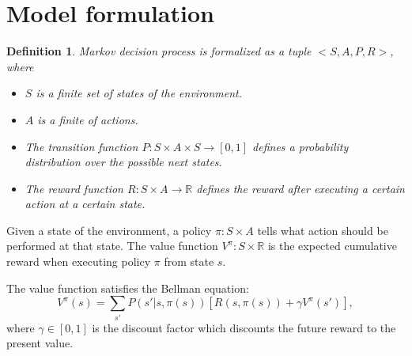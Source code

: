 \documentclass{article} %
\newtheorem{definition}{Definition}
\begin{document}



\section{Model formulation}

\begin{definition} Markov decision process is formalized as a tuple $<S, A, P, R>$, where
\begin{itemize}{}
\item $S$ is a finite set of states of the environment.
\item $A$ is a finite of actions.
\item The transition function $P:S \times A \times S \rightarrow [0, 1]$ defines a probability distribution over the possible next states. 
\item The reward function $R:S \times A \rightarrow \mathbb{R}$ defines the reward after executing a certain action at a certain state.
\end{itemize}
\end{definition}

Given a state of the environment, a policy $\pi: S \times A$ tells what action should be performed at that state. 
The value function $V^{\pi}: S \times \mathbb{R}$ is the expected cumulative reward when executing
policy $\pi$ from state $s$.

The value function satisfies the Bellman equation:
\begin{equation}
    V^{\pi}(s) = \sum_{s'}P(s'|s, \pi(s))[R(s, \pi(s)) + \gamma V^{\pi}(s')],
    \label{eq:V}
\end{equation}
where $\gamma \in [0, 1]$ is the discount factor which discounts the future reward to the present value.
\end{document}
